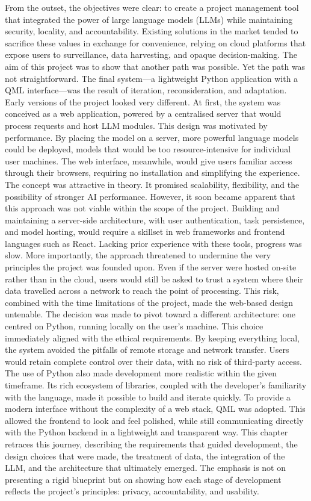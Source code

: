 \documentclass{report}
\begin{document}
From the outset, the objectives were clear: to create a project management tool that integrated the power of large language models (LLMs) while maintaining security, locality, and accountability. Existing solutions in the market tended to sacrifice these values in exchange for convenience, relying on cloud platforms that expose users to surveillance, data harvesting, and opaque decision-making. The aim of this project was to show that another path was possible.
Yet the path was not straightforward. The final system—a lightweight Python application with a QML interface—was the result of iteration, reconsideration, and adaptation. Early versions of the project looked very different. At first, the system was conceived as a web application, powered by a centralised server that would process requests and host LLM modules. This design was motivated by performance. By placing the model on a server, more powerful language models could be deployed, models that would be too resource-intensive for individual user machines. The web interface, meanwhile, would give users familiar access through their browsers, requiring no installation and simplifying the experience.
The concept was attractive in theory. It promised scalability, flexibility, and the possibility of stronger AI performance. However, it soon became apparent that this approach was not viable within the scope of the project. Building and maintaining a server-side architecture, with user authentication, task persistence, and model hosting, would require a skillset in web frameworks and frontend languages such as React. Lacking prior experience with these tools, progress was slow. More importantly, the approach threatened to undermine the very principles the project was founded upon. Even if the server were hosted on-site rather than in the cloud, users would still be asked to trust a system where their data travelled across a network to reach the point of processing. This risk, combined with the time limitations of the project, made the web-based design untenable.
The decision was made to pivot toward a different architecture: one centred on Python, running locally on the user’s machine. This choice immediately aligned with the ethical requirements. By keeping everything local, the system avoided the pitfalls of remote storage and network transfer. Users would retain complete control over their data, with no risk of third-party access. The use of Python also made development more realistic within the given timeframe. Its rich ecosystem of libraries, coupled with the developer’s familiarity with the language, made it possible to build and iterate quickly. To provide a modern interface without the complexity of a web stack, QML was adopted. This allowed the frontend to look and feel polished, while still communicating directly with the Python backend in a lightweight and transparent way.
This chapter retraces this journey, describing the requirements that guided development, the design choices that were made, the treatment of data, the integration of the LLM, and the architecture that ultimately emerged. The emphasis is not on presenting a rigid blueprint but on showing how each stage of development reflects the project’s principles: privacy, accountability, and usability.
\end{document}
